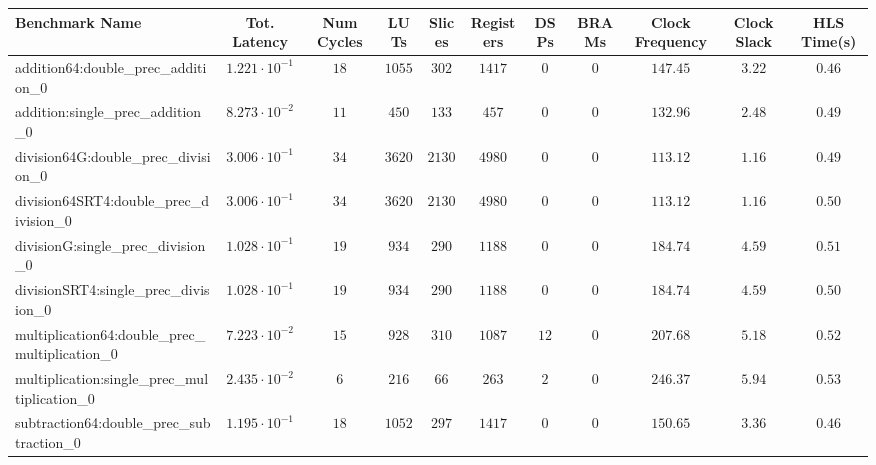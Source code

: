 \begin{tabular}{|l|c|c|c|c|c|c|c|c|c|c|}
\hline
Benchmark Name                                   & Tot. Latency            & Num Cycles & LUTs      & Slices   & Registers & DSPs   & BRAMs & Clock Frequency & Clock Slack & HLS Time(s) \\
\hline
addition64:double\_prec\_addition\_0             & $ 1.221 \cdot 10^{-1} $ & $ 18     $ & $ 1055  $ & $ 302  $ & $ 1417  $ & $ 0  $ & $ 0 $ & $ 147.45      $ & $ 3.22    $ & $ 0.46    $ \\
addition:single\_prec\_addition\_0               & $ 8.273 \cdot 10^{-2} $ & $ 11     $ & $ 450   $ & $ 133  $ & $ 457   $ & $ 0  $ & $ 0 $ & $ 132.96      $ & $ 2.48    $ & $ 0.49    $ \\
division64G:double\_prec\_division\_0            & $ 3.006 \cdot 10^{-1} $ & $ 34     $ & $ 3620  $ & $ 2130 $ & $ 4980  $ & $ 0  $ & $ 0 $ & $ 113.12      $ & $ 1.16    $ & $ 0.49    $ \\
division64SRT4:double\_prec\_division\_0         & $ 3.006 \cdot 10^{-1} $ & $ 34     $ & $ 3620  $ & $ 2130 $ & $ 4980  $ & $ 0  $ & $ 0 $ & $ 113.12      $ & $ 1.16    $ & $ 0.50    $ \\
divisionG:single\_prec\_division\_0              & $ 1.028 \cdot 10^{-1} $ & $ 19     $ & $ 934   $ & $ 290  $ & $ 1188  $ & $ 0  $ & $ 0 $ & $ 184.74      $ & $ 4.59    $ & $ 0.51    $ \\
divisionSRT4:single\_prec\_division\_0           & $ 1.028 \cdot 10^{-1} $ & $ 19     $ & $ 934   $ & $ 290  $ & $ 1188  $ & $ 0  $ & $ 0 $ & $ 184.74      $ & $ 4.59    $ & $ 0.50    $ \\
multiplication64:double\_prec\_multiplication\_0 & $ 7.223 \cdot 10^{-2} $ & $ 15     $ & $ 928   $ & $ 310  $ & $ 1087  $ & $ 12 $ & $ 0 $ & $ 207.68      $ & $ 5.18    $ & $ 0.52    $ \\
multiplication:single\_prec\_multiplication\_0   & $ 2.435 \cdot 10^{-2} $ & $ 6      $ & $ 216   $ & $ 66   $ & $ 263   $ & $ 2  $ & $ 0 $ & $ 246.37      $ & $ 5.94    $ & $ 0.53    $ \\
subtraction64:double\_prec\_subtraction\_0       & $ 1.195 \cdot 10^{-1} $ & $ 18     $ & $ 1052  $ & $ 297  $ & $ 1417  $ & $ 0  $ & $ 0 $ & $ 150.65      $ & $ 3.36    $ & $ 0.46    $ \\

\end{tabular}
